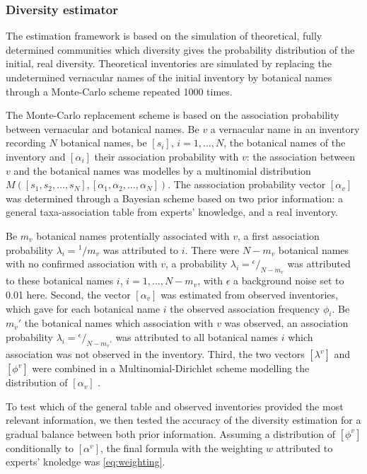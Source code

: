 \documentclass[
  11pt,
  french,
  A4paper,
  extrafontsizes,onecolumn,openright
  ]{memoir}
\begin{document}
\subsubsection{Diversity estimator}\label{diversity-estimator}

The estimation framework is based on the simulation of theoretical,
fully determined communities which diversity gives the probability
distribution of the initial, real diversity. Theoretical inventories are
simulated by replacing the undetermined vernacular names of the initial
inventory by botanical names through a Monte-Carlo scheme repeated 1000
times.

The Monte-Carlo replacement scheme is based on the association
probability between vernacular and botanical names. Be \(v\) a
vernacular name in an inventory recording \(N\) botanical names, be
\([s_i]\), \(i={1,...,N}\), the botanical names of the inventory and
\([\alpha_i]\) their association probability with \(v\): the association
between \(v\) and the botanical names was modelles by a multinomial
distribution
\(M([s_1, s_2, …, s_N] ,[\alpha_1, \alpha_2,…, \alpha_N])\). The
asssociation probability vector \([\alpha_v]\) was determined through a
Bayesian scheme based on two prior information: a general
taxa-association table from experts' knowledge, and a real inventory.

Be \(m_v\) botanical names protentially associated with \(v\), a first
association probability \(\lambda_i={}^1/m_v\) was attributed to \(i\).
There were \(N-m_v\) botanical names with no confirmed association with
\(v\), a probability \(\lambda_i={}^\epsilon\big/_{N-m_v}\) was
attributed to these botanical names \(i\), \(i={1,...,N-m_v}\), with
\(\epsilon\) a background noise set to 0.01 here. Second, the vector
\([\alpha_v]\) was estimated from observed inventories, which gave for
each botanical name \(i\) the observed association frequency \(\phi_i\).
Be \(m_v'\) the botanical names which association with \(v\) was
observed, an association probability
\(\lambda_i={}^\epsilon\big/_{N-m_v'}\) was attributed to all botanical
names \(i\) which association was not observed in the inventory. Third,
the two vectors \([\lambda^v]\) and \([\phi^v]\) were combined in a
Multinomial-Dirichlet scheme modelling the distribution of
\([\alpha_v]\) \autocite{McCarthy2007}.

To test which of the general table and observed inventories provided the
most relevant information, we then tested the accuracy of the diversity
estimation for a gradual balance between both prior information.
Assuming a distribution of \([\phi^v]\) conditionally to \([\alpha^v]\),
the final formula with the weighting \(w\) attributed to experts'
knoledge was \eqref{eq:weighting}.
\end{document}
